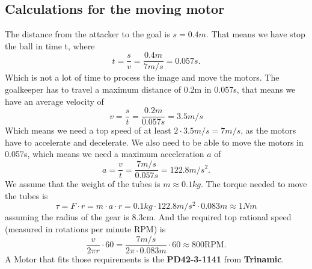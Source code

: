 \subsection{Calculations for the moving motor}\label{subsec:moving_motor}
The distance from the attacker to the goal is $s=0.4m$.
That means we have stop the ball in time t, where
\begin{equation}
    \label{eq:stopping_time}
    t = \frac{s}{v} = \frac{0.4m}{7m/s} = 0.057s.
\end{equation}
Which is not a lot of time to process the image and move the motors.
The goalkeeper has to travel a maximum distance of 0.2m in 0.057s, that means we have an average velocity of
\begin{equation}
    \label{eq:average_velocity}
    v = \frac{s}{t} = \frac{0.2m}{0.057s} = 3.5m/s
\end{equation}
Which means we need a top speed of at least $2\cdot3.5m/s=7m/s$, as the motors have to accelerate and decelerate.
We also need to be able to move the motors in 0.057s, which means we need a maximum acceleration $a$ of
\begin{equation}
    \label{eq:acceleration}
    a = \frac{v}{t} = \frac{7m/s}{0.057s} = 122.8m/s^2.
\end{equation}
We assume that the weight of the tubes is $m \approx 0.1kg$.
The torque needed to move the tubes is
\begin{equation}
    \label{eq:torque}
    \tau = F \cdot r = m \cdot a \cdot r = 0.1kg \cdot 122.8m/s^2 \cdot 0.083m \approx 1Nm
\end{equation}
assuming the radius of the gear is 8.3cm.
And the required top rational speed (measured in rotations per minute $\text{RPM}$) is
\begin{equation}
    \label{eq:top_rpm}
    \frac{v}{2\pi r} \cdot 60 = \frac{7m/s}{2\pi \cdot 0.083m} \cdot 60 \approx 800\text{RPM}.
\end{equation}
A Motor that fits those requirements is the \textbf{PD42-3-1141} from \textbf{Trinamic}.

